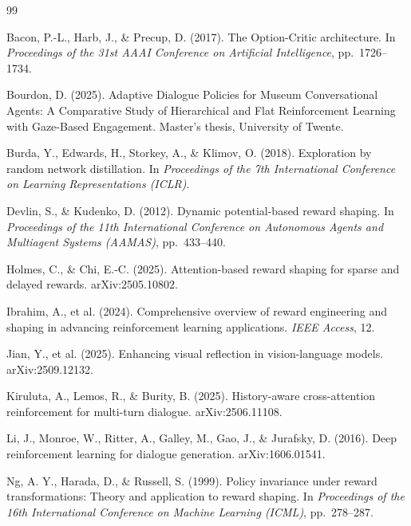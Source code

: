 \documentclass[12pt,a4paper]{article}
\begin{document}
\begin{thebibliography}{99}

Bacon, P.-L., Harb, J., \& Precup, D. (2017).
The Option-Critic architecture.
In \textit{Proceedings of the 31st AAAI Conference on Artificial Intelligence}, pp.~1726--1734.

Bourdon, D. (2025).
Adaptive Dialogue Policies for Museum Conversational Agents: A Comparative Study of Hierarchical and Flat Reinforcement Learning with Gaze-Based Engagement.
Master's thesis, University of Twente.

Burda, Y., Edwards, H., Storkey, A., \& Klimov, O. (2018).
Exploration by random network distillation.
In \textit{Proceedings of the 7th International Conference on Learning Representations (ICLR)}.

Devlin, S., \& Kudenko, D. (2012).
Dynamic potential-based reward shaping.
In \textit{Proceedings of the 11th International Conference on Autonomous Agents and Multiagent Systems (AAMAS)}, pp.~433--440.

Holmes, C., \& Chi, E.-C. (2025).
Attention-based reward shaping for sparse and delayed rewards.
arXiv:2505.10802.

Ibrahim, A., et al. (2024).
Comprehensive overview of reward engineering and shaping in advancing reinforcement learning applications.
\textit{IEEE Access}, 12.

Jian, Y., et al. (2025).
Enhancing visual reflection in vision-language models.
arXiv:2509.12132.

Kiruluta, A., Lemos, R., \& Burity, B. (2025).
History-aware cross-attention reinforcement for multi-turn dialogue.
arXiv:2506.11108.

Li, J., Monroe, W., Ritter, A., Galley, M., Gao, J., \& Jurafsky, D. (2016).
Deep reinforcement learning for dialogue generation.
arXiv:1606.01541.

Ng, A. Y., Harada, D., \& Russell, S. (1999).
Policy invariance under reward transformations: Theory and application to reward shaping.
In \textit{Proceedings of the 16th International Conference on Machine Learning (ICML)}, pp.~278--287.


\end{thebibliography}
\end{document}

